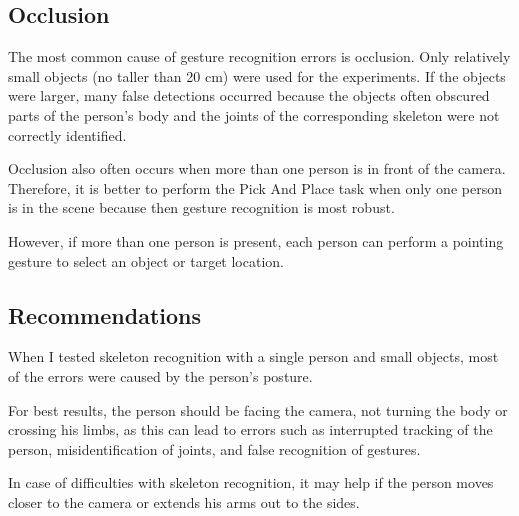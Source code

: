 \subsection{Occlusion}
The most common cause of gesture recognition errors is occlusion. Only relatively small objects (no taller than 20 cm) were used for the experiments. If the objects were larger, many false detections occurred because the objects often obscured parts of the person's body and the joints of the corresponding skeleton were not correctly identified.\par
Occlusion also often occurs when more than one person is in front of the camera. Therefore, it is better to perform the Pick And Place task when only one person is in the scene because then gesture recognition is most robust.\par
However, if more than one person is present, each person can perform a pointing gesture to select an object or target location.\par

\subsection{Recommendations}
When I tested skeleton recognition with a single person and small objects, most of the errors were caused by the person's posture.\par
For best results, the person should be facing the camera, not turning the body or crossing his limbs, as this can lead to errors such as interrupted tracking of the person, misidentification of joints, and false recognition of gestures.\par
In case of difficulties with skeleton recognition, it may help if the person moves closer to the camera or extends his arms out to the sides.\par